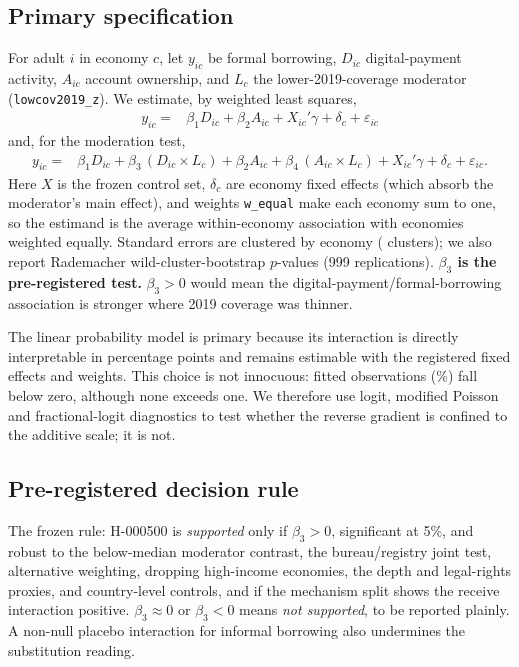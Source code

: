 \subsection{Primary specification}

For adult $i$ in economy $c$, let $y_{ic}$ be formal borrowing, $D_{ic}$ digital-payment
activity, $A_{ic}$ account ownership, and $L_c$ the lower-2019-coverage moderator
(\texttt{lowcov2019\_z}). We estimate, by weighted least squares,
\begin{align}
y_{ic} ={}& \beta_1 D_{ic} + \beta_2 A_{ic} + X_{ic}'\gamma + \delta_c + \varepsilon_{ic}
  \tag{M1}
\end{align}
and, for the moderation test,
\begin{align}
y_{ic} ={}& \beta_1 D_{ic} + \beta_3\,(D_{ic}\times L_c)
  + \beta_2 A_{ic} + \beta_4\,(A_{ic}\times L_c)
  + X_{ic}'\gamma + \delta_c + \varepsilon_{ic}.
  \tag{M2}
\end{align}
Here $X$ is the frozen control set, $\delta_c$ are economy fixed effects (which absorb the
moderator's main effect), and weights \texttt{w\_equal} make each economy sum to one, so the
estimand is the average within-economy association with economies weighted equally. Standard
errors are clustered by economy (\NEconomies{} clusters); we also report Rademacher
wild-cluster-bootstrap $p$-values (999 replications). \textbf{$\beta_3$ is the pre-registered
test.} $\beta_3>0$ would mean the digital-payment/formal-borrowing association is stronger
where 2019 coverage was thinner.

The linear probability model is primary because its interaction is directly interpretable in
percentage points and remains estimable with the registered fixed effects and weights. This
choice is not innocuous: \LPMBelowZeroN{} fitted observations (\LPMOutsidePct\%) fall below
zero, although none exceeds one. We therefore use logit, modified Poisson and fractional-logit
diagnostics to test whether the reverse gradient is confined to the additive scale; it is not.

\subsection{Pre-registered decision rule}

The frozen rule: H-000500 is \emph{supported} only if $\beta_3>0$, significant at 5\%, and
robust to the below-median moderator contrast, the bureau/registry joint test, alternative
weighting, dropping high-income economies, the depth and legal-rights proxies, and
country-level controls, and if the mechanism split shows the receive interaction positive.
$\beta_3\approx0$ or $\beta_3<0$ means \emph{not supported}, to be reported plainly. A
non-null placebo interaction for informal borrowing also undermines the substitution
reading.

